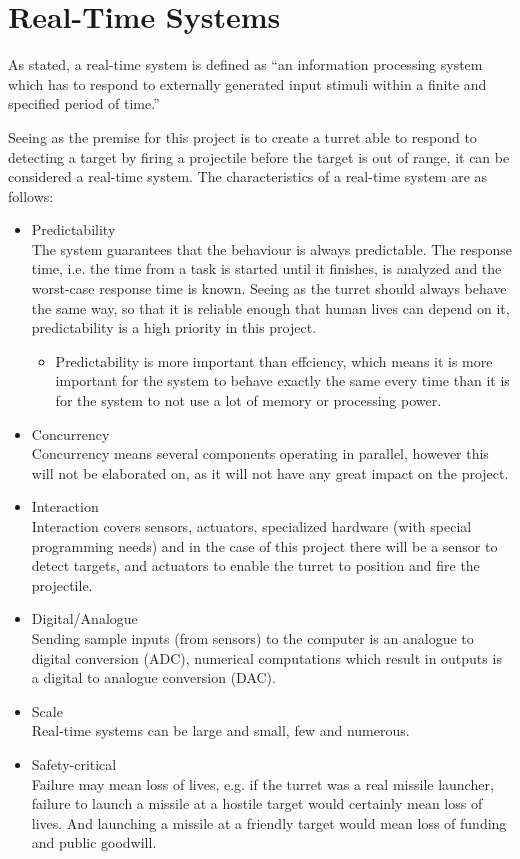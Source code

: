 \section{Real-Time Systems}

As stated, a real-time system is defined as ``an information processing system which has to respond to externally generated input stimuli within a finite and specified period of time.'' \cite{realtime} 

Seeing as the premise for this project is to create a turret able to respond to detecting a target by firing a projectile before the target is out of range, it can be considered a real-time system. The characteristics of a real-time system are as follows:
\begin{itemize}
	\item {Predictability} \\ The system guarantees that the behaviour is always predictable. The response time, i.e. the time from a task is started until it finishes, is analyzed and the worst-case response time is known. Seeing as the turret should always behave the same way, so that it is reliable enough that human lives can depend on it, predictability is a high priority in this project.
		\begin{itemize}
			\item Predictability is more important than effciency, which means it is more important for the system to behave exactly the same every time than it is for the system to not use a lot of memory or processing power.
		\end{itemize}
	\item {Concurrency} \\ Concurrency means several components operating in parallel, however this will not be elaborated on, as it will not have any great impact on the project. 
	\item {Interaction} \\ Interaction covers sensors, actuators, specialized hardware (with special programming needs) and in the case of this project there will be a sensor to detect targets, and actuators to enable the turret to position and fire the projectile.
	\item {Digital/Analogue} \\ Sending sample inputs (from sensors) to the computer is an analogue to digital conversion (ADC), numerical computations which result in outputs is a digital to analogue conversion (DAC).
	\item {Scale} \\ Real-time systems can be large and small, few and numerous.
	\item {Safety-critical} \\ Failure may mean loss of lives, e.g. if the turret was a real missile launcher, failure to launch a missile at a hostile target would certainly mean loss of lives. And launching a missile at a friendly target would mean loss of funding and public goodwill.
\end{itemize}\cite{realtime}

